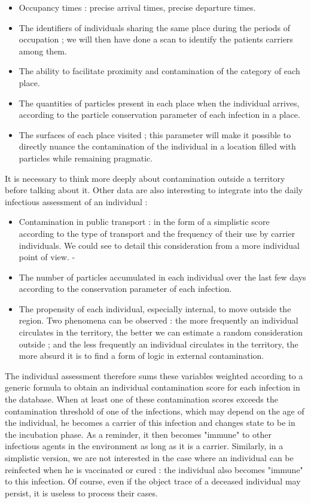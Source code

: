 \begin{itemize}
\item Occupancy times : precise arrival times, precise departure times.
\item The identifiers of individuals sharing the same place during the periods of occupation ; we will then have done a scan to identify the patients carriers among them.
\item The ability to facilitate proximity and contamination of the category of each place.
\item The quantities of particles present in each place when the individual arrives, according to the particle conservation parameter of each infection in a place.
\item The surfaces of each place visited ; this parameter will make it possible to directly nuance the contamination of the individual in a location filled with particles while remaining pragmatic.\\
\end{itemize}

It is necessary to think more deeply about contamination outside a territory before talking about it. Other data are also interesting to integrate into the daily infectious assessment of an individual :\\

\begin{itemize}
\item Contamination in public transport : in the form of a simplistic score according to the type of transport and the frequency of their use by carrier individuals. We could see to detail this consideration from a more individual point of view.
-\item The number of particles accumulated in each individual over the last few days according to the conservation parameter of each infection.
\item The propensity of each individual, especially internal, to move outside the region. Two phenomena can be observed : the more frequently an individual circulates in the territory, the better we can estimate a random consideration outside ; and the less frequently an individual circulates in the territory, the more absurd it is to find a form of logic in external contamination.\\
\end{itemize}

The individual assessment therefore sums these variables weighted according to a generic formula to obtain an individual contamination score for each infection in the database. When at least one of these contamination scores exceeds the contamination threshold of one of the infections, which may depend on the age of the individual, he becomes a carrier of this infection and changes state to be in the incubation phase. As a reminder, it then becomes "immune" to other infectious agents in the environment as long as it is a carrier. Similarly, in a simplistic version, we are not interested in the case where an individual can be reinfected when he is vaccinated or cured : the individual also becomes "immune" to this infection. Of course, even if the object trace of a deceased individual may persist, it is useless to process their cases.\\

